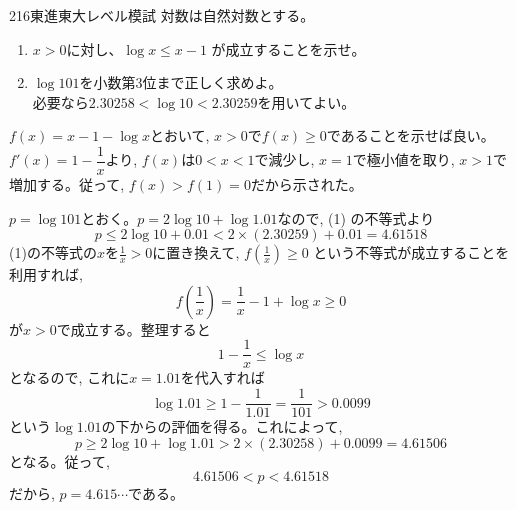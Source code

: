\begin{prob}{216}{}{東進東大レベル模試}
 対数は自然対数とする。
 \begin{enumerate}
  \item $x>0$に対し、$\log x \le x-1$ が成立することを示せ。
  \item $\log 101$を小数第3位まで正しく求めよ。 \\ 必要なら$2.30258<\log 10 <2.30259$を用いてよい。
 \end{enumerate}
\end{prob}
$f(x)=x-1- \log{x} $とおいて, $x>0$で$f(x)\geq 0$であることを示せば良い。$f'(x) = 1- \dfrac{1}{x}$より, $f(x)$は$0<x<1$で減少し, $x=1$で極小値を取り, $x>1$で増加する。従って, $f(x)>f(1) = 0$だから示された。

$p=\log{101}$とおく。$p=2\log{10}+\log{1.01}$なので, (1) の不等式より
\[ p\leq 2\log{10}+ 0.01 < 2\times (2.30259) + 0.01 = 4.61518 \]
(1)の不等式の$x$を$\frac{1}{x}>0$に置き換えて, $f(\frac{1}{x})\geq 0$ という不等式が成立することを利用すれば, 
\[ f(\frac{1}{x})= \dfrac{1}{x}- 1 + \log{x} \geq 0 \]
が$x>0$で成立する。整理すると
\[ 1-\dfrac{1}{x}\leq \log{x} \]
となるので, これに$x=1.01$を代入すれば
\[ \log{1.01} \geq 1- \dfrac{1}{1.01} = \dfrac{1}{101} > 0.0099 \]
という$\log{1.01}$の下からの評価を得る。これによって, 
\[ p \geq 2\log{10} + \log{1.01}  > 2\times (2.30258) + 0.0099 =4.61506 \]
となる。従って,
\[ 4.61506 < p < 4.61518 \]
だから, $p= 4.615\cdots $である。
